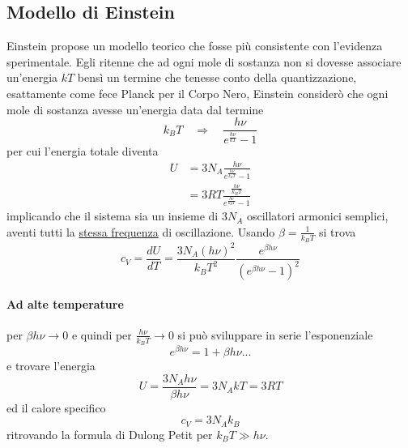 \subsection{Modello di Einstein}
Einstein propose un modello teorico che fosse più consistente con l'evidenza sperimentale.
Egli ritenne che ad ogni mole di sostanza non si dovesse associare un'energia $kT$ bensì un termine che tenesse conto della quantizzazione, esattamente come fece Planck per il Corpo Nero, Einstein considerò che ogni mole di sostanza avesse un'energia data dal termine
\begin{equation}
k_B T \quad\Rightarrow\quad \frac{ h \nu}{e^{ \frac{ h\nu}{k T } } - 1 }
\end{equation}
per cui l'energia totale diventa
\begin{equation}
\begin{split}
U & = 3 N_A \frac{h \nu}{e^{ \frac{h\nu}{k_B T} } - 1} \\
& = 3 R T \frac{\frac{h\nu}{k_B T}}{e^{ \frac{h\nu}{k_B T} } - 1}
\end{split}
\end{equation}
implicando che il sistema sia un insieme di $3 N_A$ oscillatori armonici semplici, aventi tutti la \underline{stessa frequenza} di oscillazione.
Usando $\beta = \frac{1}{k_B T}$ si trova
\begin{equation}
c_V = \frac{dU}{dT} = \frac{3N_A (h\nu)^2}{k_B T^2} \frac{e^{ \beta h \nu }}{(e^{ \beta h \nu }-1)^2}
\end{equation}

\paragraph{Ad alte temperature} per $\beta h \nu \to 0$ e quindi per $\frac{h\nu}{k_B T} \to 0$ si può sviluppare in serie l'esponenziale
\begin{equation}
e^{ \beta h \nu } = 1 + \beta h \nu ...
\end{equation}
e trovare l'energia
\begin{equation}
U = \frac{ 3 N_A h \nu}{\beta h \nu } = 3 N_A k T = 3 R T
\end{equation}
ed il calore specifico 
\begin{equation}
c_V = 3 N_A k_B
\end{equation}
ritrovando la formula di Dulong Petit per $k_B T \gg h \nu$.

